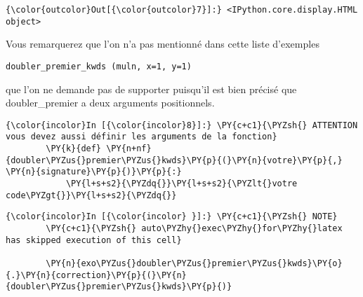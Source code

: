 \begin{Verbatim}[commandchars=\\\{\}]
{\color{outcolor}Out[{\color{outcolor}7}]:} <IPython.core.display.HTML object>
\end{Verbatim}
            
    Vous remarquerez que l'on n'a pas mentionné dans cette liste d'exemples

\begin{verbatim}
doubler_premier_kwds (muln, x=1, y=1)
\end{verbatim}

que l'on ne demande pas de supporter puisqu'il est bien précisé que
doubler\_premier a deux arguments positionnels.

    \begin{Verbatim}[commandchars=\\\{\}]
{\color{incolor}In [{\color{incolor}8}]:} \PY{c+c1}{\PYZsh{} ATTENTION vous devez aussi définir les arguments de la fonction}
        \PY{k}{def} \PY{n+nf}{doubler\PYZus{}premier\PYZus{}kwds}\PY{p}{(}\PY{n}{votre}\PY{p}{,} \PY{n}{signature}\PY{p}{)}\PY{p}{:}
            \PY{l+s+s2}{\PYZdq{}}\PY{l+s+s2}{\PYZlt{}votre code\PYZgt{}}\PY{l+s+s2}{\PYZdq{}}
\end{Verbatim}


    \begin{Verbatim}[commandchars=\\\{\}]
{\color{incolor}In [{\color{incolor} }]:} \PY{c+c1}{\PYZsh{} NOTE}
        \PY{c+c1}{\PYZsh{} auto\PYZhy{}exec\PYZhy{}for\PYZhy{}latex has skipped execution of this cell}
        
        \PY{n}{exo\PYZus{}doubler\PYZus{}premier\PYZus{}kwds}\PY{o}{.}\PY{n}{correction}\PY{p}{(}\PY{n}{doubler\PYZus{}premier\PYZus{}kwds}\PY{p}{)}
\end{Verbatim}



    
    
    
